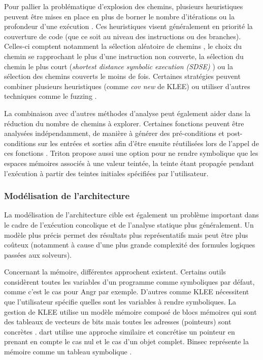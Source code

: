                 Pour pallier la problématique d'explosion des chemins, plusieurs heuristiques peuvent être mises en place en plus de borner le nombre d'itérations ou la profondeur d'une exécution \cite{Cadar/OSDI08, Goderfoid/NDSS08, schwartz2010all, jamrozik2013generating}. 
                Ces heuristiques visent généralement en priorité la couverture de code (que ce soit au niveau des instructions ou des branches). Celles-ci comptent notamment la sélection aléatoire de chemins \cite{Cadar/ACM13}, le choix du chemin se rapprochant le plus d'une instruction non couverte, la sélection du chemin le plus court (\textit{shortest distance symbolic execution (SDSE)} \cite{chipounov2012s2e}) ou la sélection des chemins couverts le moins de fois. Certaines stratégies peuvent combiner plusieurs heuristiques (comme \textit{cov new} de KLEE) ou utiliser d'autres techniques comme le fuzzing \cite{majumdar2007hybrid, stephens2016driller, yun2018qsym}.
                
                La combinaison avec d'autres méthodes d'analyse peut également aider dans la réduction du nombre de chemins à explorer. Certaines fonctions peuvent être analysées indépendamment, de manière à générer des pré-conditions et post-conditions sur les entrées et sorties afin d'être ensuite réutilisées lors de l'appel de ces fonctions \cite{Godefroid/PLDI11}.
                Triton \cite{salwanthesis} propose aussi une option pour ne rendre symbolique que les espaces mémoires associés à une valeur teintée, la teinte étant propagée pendant l'exécution à partir des teintes initiales spécifiées par l'utilisateur.

            \subsubsection{Modélisation de l'architecture}
            
                La modélisation de l'architecture cible est également un problème important dans le cadre de l'exécution concolique et de l'analyse statique plus généralement. 
                Un modèle plus précis permet des résultats plus représentatifs mais peut être plus coûteux (notamment à cause d'une plus grande complexité des formules logiques passées aux solveurs). 
                
                Concernant la mémoire, différentes approchent existent. Certains outils considèrent toutes les variables d'un programme comme symboliques par défaut, comme c'est le cas pour Angr \cite{Shoshitaishvili/SSP16} par exemple. 
                D'autres comme KLEE nécessitent que l'utilisateur spécifie quelles sont les variables à rendre symboliques.
                La gestion de KLEE utilise un modèle mémoire composé de \og blocs mémoires \fg{} qui sont des tableaux de vecteurs de bits mais toutes les adresses (pointeurs) sont concrètes \cite{cadar2020klee}. 
                \gls{dart} utilise une approche similaire et concrétise un pointeur en prenant en compte le cas nul et le cas d'un objet complet. 
                Binsec représente la mémoire comme un tableau symbolique \cite{Djoudi/CTACAS15}.
                
